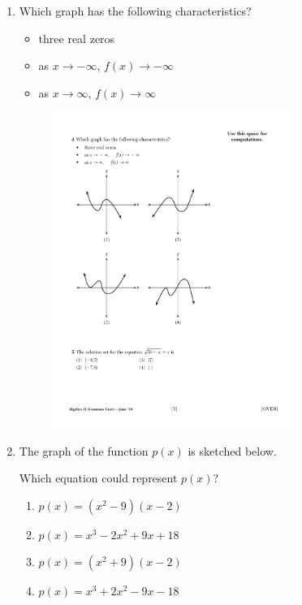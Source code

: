 \documentclass[12pt, oneside]{article}
\begin{document}
\begin{enumerate}
\item Which graph has the following characteristics?
\begin{itemize}
\item three real zeros
\item as $x \rightarrow - \infty$, $f(x) \rightarrow - \infty$
\item as $x \rightarrow \infty$, $f(x) \rightarrow \infty$
\end{itemize}
\begin{figure}[!ht]
    \centering
    \includegraphics[width=0.75\textwidth]{cubic-graphs.pdf}
\end{figure} %

\newpage
\item The graph of the function $p(x)$ is sketched below.
\begin{center}
\end{center}
Which equation could represent $p(x)$?
\begin{enumerate}
    \item $p(x)=(x^2- 9)(x-2)$
    \item $p(x)=x^3 -2x^2+ 9x+18$
    \item $p(x)=(x^2+ 9)(x-2)$
    \item $p(x)=x^3 +2x^2- 9x-18$
\end{enumerate} %


\end{enumerate}
\end{document}
